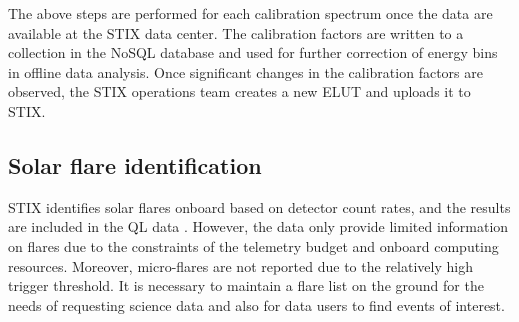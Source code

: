 \documentclass[referee]{preaa} %
\begin{document}
The above steps are performed for each calibration spectrum once the data are available at the STIX data center. 
The calibration factors are written to a collection in the NoSQL database and used for further correction of energy bins in offline data analysis.   
Once significant changes in the calibration factors are observed, the STIX operations team creates a new ELUT and uploads it to STIX.

\subsection{Solar flare identification}
STIX identifies solar flares onboard based on detector count rates, and the results are included in the QL data \citep{stix2020}.  However,  the data only provide limited information on flares due to the constraints of the telemetry budget and onboard computing resources.  Moreover, micro-flares are not reported due to the relatively high trigger threshold.
It is necessary to maintain a flare list on the ground for the needs of requesting science data and also for data users to find events of interest. 
\end{document}
